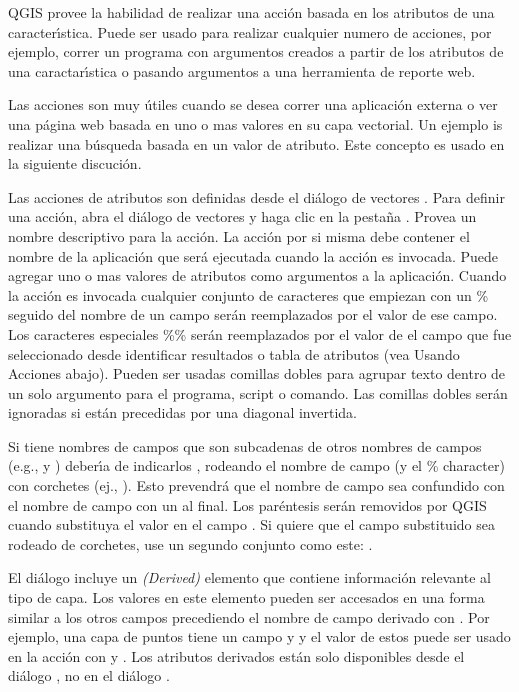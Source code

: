 QGIS provee la habilidad de realizar una acci\'on basada en los atributos de una
caracter\'{\i}stica. Puede ser usado para realizar cualquier numero de acciones, por ejemplo,
correr un programa con argumentos creados a partir de los atributos de una caractar\'{\i}stica o
pasando argumentos a una herramienta de reporte web.

Las acciones son muy \'utiles cuando se desea correr una aplicaci\'on externa o ver
una p\'agina web basada en uno o mas valores en su capa vectorial. Un ejemplo
is realizar una b\'usqueda basada en un valor de atributo. Este concepto es usado en la  
siguiente discuci\'on.


Las acciones de atributos son definidas desde el di\'alogo de vectores . Para definir una
acci\'on, abra el di\'alogo de vectores  y haga clic en la
pesta\~na . Provea un nombre descriptivo para la acci\'on. La acci\'on por si misma
debe contener el nombre de la aplicaci\'on que ser\'a ejecutada cuando la acci\'on es invocada.
Puede agregar uno o mas valores de atributos como argumentos
a la aplicaci\'on. Cuando la acci\'on es invocada cualquier conjunto de caracteres que empiezan
con un \% seguido del nombre de un campo ser\'an reemplazados por el valor de ese campo.
Los caracteres especiales \%\% \index{\%\%}ser\'an reemplazados por el valor
de el campo que fue seleccionado desde identificar resultados o tabla de atributos (vea
Usando Acciones abajo).  Pueden ser usadas comillas dobles para agrupar texto dentro
de un solo argumento para el programa, script o comando. Las comillas dobles ser\'an ignoradas
si est\'an precedidas por una diagonal invertida.

Si tiene nombres de campos que son subcadenas de otros nombres de campos (e.g., 
y ) deber\'{\i}a de indicarlos
, rodeando el nombre de campo (y el \% character) con 
corchetes (ej., \usertext{[\%col10]}). Esto prevendr\'a que el nombre de campo 
sea confundido con el nombre de campo  con un 
al final. Los par\'entesis ser\'an removidos por QGIS cuando substituya el valor en el campo
. Si quiere que el campo substituido sea rodeado de corchetes,
use un segundo conjunto como este: \usertext{[[\%col10]]}.

El di\'alogo  incluye un {\em (Derived)} elemento que
contiene informaci\'on relevante al tipo de capa. Los valores
en este elemento pueden ser accesados en una forma similar a los otros campos
precediendo el nombre de campo derivado  con . Por
ejemplo, una capa de puntos tiene un campo  y  y el
valor de estos puede ser usado en la acci\'on con  y
. Los atributos derivados est\'an solo disponibles desde el di\'alogo
, no en el di\'alogo .

